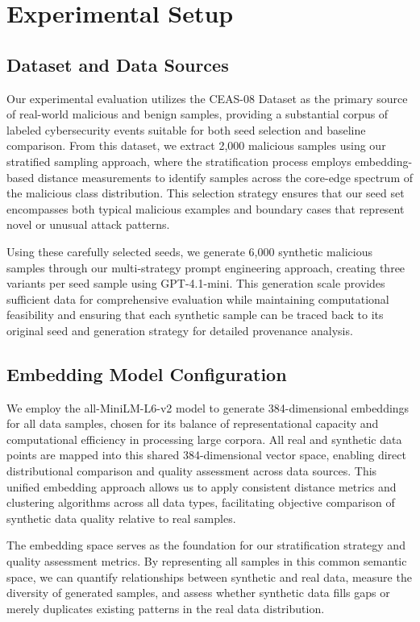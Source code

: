 \section{Experimental Setup}

\subsection{Dataset and Data Sources}

Our experimental evaluation utilizes the CEAS-08 Dataset as the primary source of real-world malicious and benign samples, providing a substantial corpus of labeled cybersecurity events suitable for both seed selection and baseline comparison. From this dataset, we extract 2,000 malicious samples using our stratified sampling approach, where the stratification process employs embedding-based distance measurements to identify samples across the core-edge spectrum of the malicious class distribution. This selection strategy ensures that our seed set encompasses both typical malicious examples and boundary cases that represent novel or unusual attack patterns.

Using these carefully selected seeds, we generate 6,000 synthetic malicious samples through our multi-strategy prompt engineering approach, creating three variants per seed sample using GPT-4.1-mini. This generation scale provides sufficient data for comprehensive evaluation while maintaining computational feasibility and ensuring that each synthetic sample can be traced back to its original seed and generation strategy for detailed provenance analysis.

\subsection{Embedding Model Configuration}

We employ the all-MiniLM-L6-v2 model to generate 384-dimensional embeddings for all data samples, chosen for its balance of representational capacity and computational efficiency in processing large corpora. All real and synthetic data points are mapped into this shared 384-dimensional vector space, enabling direct distributional comparison and quality assessment across data sources. This unified embedding approach allows us to apply consistent distance metrics and clustering algorithms across all data types, facilitating objective comparison of synthetic data quality relative to real samples.

The embedding space serves as the foundation for our stratification strategy and quality assessment metrics. By representing all samples in this common semantic space, we can quantify relationships between synthetic and real data, measure the diversity of generated samples, and assess whether synthetic data fills gaps or merely duplicates existing patterns in the real data distribution.

